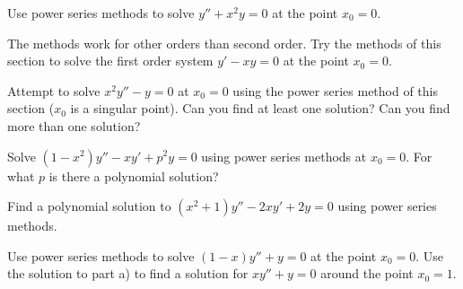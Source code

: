\documentclass{ximera}
\begin{document}
\begin{exercise}
    Use power series methods to solve $y''+x^2y = 0$ at the point $x_0 = 0$.
\end{exercise}

\begin{exercise} 
    The methods work for other orders than second order.  Try the methods of this section to solve the first order system $y'-xy = 0$ at the point $x_0 = 0$.
\end{exercise}

\begin{exercise}%
    Attempt to solve $x^2 y'' - y = 0$ at $x_0 = 0$ using the power series method of this section ($x_0$ is a singular point). Can you find at least one solution?  Can you find more than one solution?
\end{exercise}

\begin{exercise}%
    \begin{tasks}
        \task Solve $(1-x^2)y''-xy' + p^2y = 0$ using power series methods at $x_0=0$.
        \task For what $p$ is there a polynomial solution?
    \end{tasks}
\end{exercise}

\begin{exercise}
    Find a polynomial solution to $(x^2+1) y''-2xy'+2y = 0$ using power series methods.
\end{exercise}

\begin{exercise}
    \begin{tasks}
        \task Use power series methods to solve $(1-x)y''+y = 0$ at the point $x_0 = 0$.
        \task Use the solution to part a) to find a solution for $xy''+y=0$ around the point $x_0=1$.
    \end{tasks}
\end{exercise}
\end{document}
